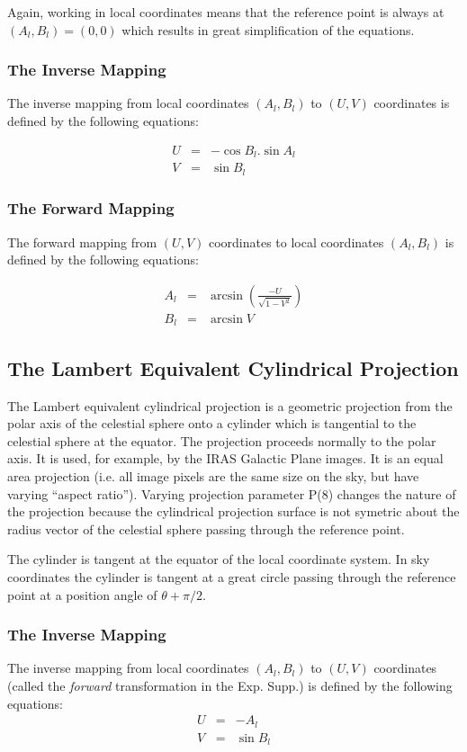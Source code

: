 Again, working in local coordinates means that the reference point is always at
$(A_{l},B_{l})=(0,0)$ which results in great simplification of the equations.

\subsubsection {The Inverse Mapping}
The inverse mapping from local coordinates $(A_{l},B_{l})$ to $(U,V)$
coordinates is defined by the following equations:

\begin{eqnarray*}
U & = & -\cos B_{l}.\sin A_{l}\\
V & = & \sin B_{l}
\end{eqnarray*}

\subsubsection {The Forward Mapping}
The forward mapping from $(U,V)$ coordinates to local coordinates
$(A_{l},B_{l})$ is defined by the following equations:

\begin{eqnarray*}
A_{l} & = & \arcsin \left( \frac{-U}{\sqrt{1-V^{2}}} \right)\\
B_{l} & = & \arcsin V
\end{eqnarray*}

\subsection {The Lambert Equivalent Cylindrical Projection}
The Lambert equivalent cylindrical projection is a geometric projection from the
polar axis of the celestial sphere onto a cylinder which is tangential to the
celestial sphere at the equator. The projection proceeds normally to the polar
axis. It is used, for example, by the IRAS Galactic Plane images. It is an equal
area projection (i.e. all image pixels are the same size on the sky, but have
varying ``aspect ratio''). Varying projection parameter P(8) changes the nature
of the projection because the cylindrical projection surface is not symetric
about the radius vector of the celestial sphere passing through the reference
point.

The cylinder is tangent at the equator of the local coordinate system. In sky
coordinates the cylinder is tangent at a great circle passing through the
reference point at a position angle of $\theta+\pi/2$.

\subsubsection {The Inverse Mapping}
The inverse mapping from local coordinates $(A_{l},B_{l})$ to $(U,V)$
coordinates (called the {\em forward} transformation in the Exp. Supp.) is
defined by the following equations:
\begin{eqnarray*}
U & = & -A_{l}\\
V & = & \sin B_{l}
\end{eqnarray*}

